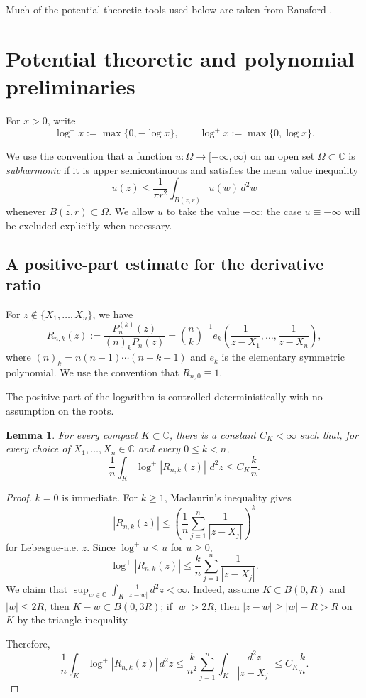 \documentclass[10pt,reqno]{amsart}
\newtheorem{lemma}[theorem]{Lemma}
\theoremstyle{remark}
\newcommand{\C}{\mathbb C}
\newcommand{\dd}{\,d}
\newcommand{\logm}{\log^-}
\newcommand{\logp}{\log^+}
\begin{document}
Much of the potential-theoretic tools used below are taken from Ransford \cite{Ran95}.
\section{Potential theoretic and polynomial preliminaries}\label{sec:prelim}
For $x>0$, write 
\[\logm x:=\max\{0,-\log x\},\qquad \logp x:=\max\{0,\log x\}.\]

We use the convention that a function
$u:\Omega\to[-\infty,\infty)$ on an open set $\Omega\subset\C$ is
\emph{subharmonic} if it is upper semicontinuous and satisfies the mean value
inequality
\[u(z)\le
    \frac{1}{\pi r^2}\int_{B(z,r)}u(w)\,d^2w\]
whenever $\overline{B(z,r)}\subset\Omega$. We allow $u$ to take the value $-\infty$;
the case $u\equiv-\infty$ will be excluded explicitly when necessary.

\subsection{A positive-part estimate for the derivative ratio}
For $z\notin\{X_1,\ldots, X_n\}$, we have 
\[R_{n,k}(z):=\frac{P_n^{(k)}(z)}{(n)_kP_n(z)}=\binom{n}{k}^{-1}e_k\left(\frac{1}{z-X_1},\ldots, \frac{1}{z-X_n}\right),\]
where $(n)_k=n(n-1)\cdots (n-k+1)$ and $e_k$ is the elementary symmetric polynomial. We use the convention that $R_{n,0}\equiv 1$.

The positive part of the logarithm is controlled deterministically with no assumption on the roots.
\begin{lemma}\label{lem:positive}
For every compact $K\subset\C$, there is a constant $C_K<\infty$ such that, for every choice of $X_1,\ldots,X_n\in\C$ and every $0\leq k<n$,
\[
 \frac{1}{n}\int_K\logp|R_{n,k}(z)|\,\dd^2z
 \leq C_K\frac{k}{n}.
\]
\end{lemma}
\begin{proof}
    $k=0$ is immediate. For $k\geq 1$, Maclaurin's inequality gives
    \[|R_{n,k}(z)|\le\left(\frac{1}{n}\sum_{j=1}^n\frac{1}{|z-X_j|}\right)^k\] for Lebesgue-a.e. $z$. Since $\logp u\le u$ for $u\ge 0$,
    \[\logp|R_{n,k}(z)|\le \frac{k}{n}\sum_{j=1}^n\frac{1}{|z-X_j|}.\]
    We claim that $\sup_{w\in \C}\int_K\frac{1}{|z-w|}\,d^2z<\infty.$ Indeed, assume $K\subset B(0,R)$ and $|w|\le 2R$, then $K-w\subset B(0,3R)$; if $|w|>2R$, then $|z-w|\ge |w|-R>R$ on $K$ by the triangle inequality.

    Therefore,
    \[\frac{1}{n}\int_K\log^+|R_{n,k}(z)|\,d^2z
    \le \frac{k}{n^2}\sum_{j=1}^n\int_K\frac{d^2z}{|z-X_j|}
    \le C_K\frac{k}{n}.\]
\end{proof}
\end{document}
